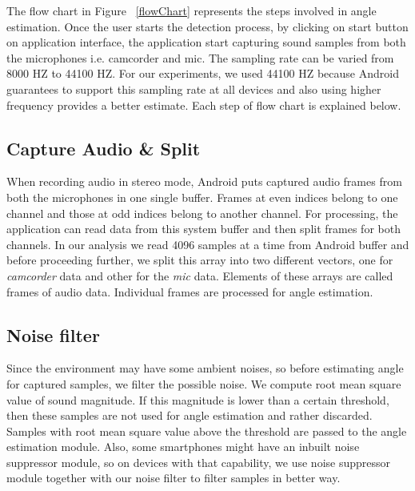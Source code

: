 The flow chart in Figure ~\ref{flowChart} represents the steps involved in angle estimation. Once the user starts the detection process, by clicking on start button on application interface, the application start capturing sound samples from both the microphones i.e. camcorder and mic. The sampling rate can be varied from 8000 HZ to 44100 HZ. For our experiments, we used 44100 HZ because Android guarantees to support this sampling rate at all devices and also using higher frequency provides a better estimate. Each step of flow chart is explained below.
\subsection{Capture Audio \& Split }
When recording audio in stereo mode, Android puts captured audio frames from both the microphones in one single buffer. Frames at even indices belong to one channel and those at odd indices belong to another channel. For processing, the application can read data from this system buffer and then split frames for both channels. In our analysis we read 4096 samples at a time from Android buffer and before proceeding further, we split this array into two different vectors, one for \textit{camcorder} data and other for the \textit{mic} data. Elements of these arrays are called frames of audio data. Individual frames are processed for angle estimation. 

\subsection{Noise filter}
Since the environment may have some ambient noises, so before estimating angle for captured samples, we filter the possible noise. We compute root mean square value of sound magnitude. If this magnitude is lower than a certain threshold, then these samples are not used for angle estimation and rather discarded. Samples with root mean square value above the threshold are passed to the angle estimation module. Also, some smartphones might have an inbuilt noise suppressor module, so on devices with that capability, we use noise suppressor module together with our noise filter to filter samples in better way.

